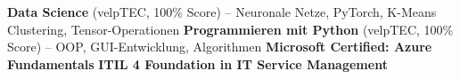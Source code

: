 %
%
%


\begin{scholarship}
                                        {\textbf{Data Science} (velpTEC, 100\% Score) -- Neuronale Netze, PyTorch, K-Means Clustering, Tensor-Operationen}
                                        {\textbf{Programmieren mit Python} (velpTEC, 100\% Score) -- OOP, GUI-Entwicklung, Algorithmen}
                                        {\textbf{Microsoft Certified: Azure Fundamentals}}
                                        {\textbf{ITIL 4 Foundation in IT Service Management}}
\end{scholarship}
